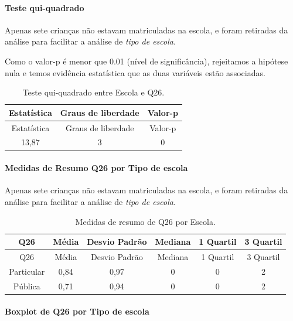 \documentclass[]{article}
\let\oldparagraph\paragraph
\renewcommand{\paragraph}[1]{\oldparagraph{#1}\mbox{}}
\begin{document}
\hypertarget{teste-qui-quadrado-66}{%
\paragraph{Teste qui-quadrado}\label{teste-qui-quadrado-66}}

Apenas sete crianças não estavam matriculadas na escola, e foram retiradas da análise para facilitar a análise de \emph{tipo de escola}.

Como o valor-p é menor que 0.01 (nível de significância), rejeitamos a hipótese nula e temos evidência estatística que as duas variáveis estão associadas.

\begin{longtable}[]{@{}ccc@{}}
\caption{\label{tab:unnamed-chunk-764}Teste qui-quadrado entre Escola e Q26.}\tabularnewline
\toprule
Estatística & Graus de liberdade & Valor-p\tabularnewline
\midrule
\endfirsthead
\toprule
Estatística & Graus de liberdade & Valor-p\tabularnewline
\midrule
\endhead
13,87 & 3 & 0\tabularnewline
\bottomrule
\end{longtable}

\cleardoublepage

\hypertarget{medidas-de-resumo-q26-por-tipo-de-escola}{%
\paragraph{Medidas de Resumo Q26 por Tipo de escola}\label{medidas-de-resumo-q26-por-tipo-de-escola}}

Apenas sete crianças não estavam matriculadas na escola, e foram retiradas da análise para facilitar a análise de \emph{tipo de escola}.

\begin{longtable}[]{@{}cccccc@{}}
\caption{\label{tab:unnamed-chunk-765}Medidas de resumo de Q26 por Escola.}\tabularnewline
\toprule
Q26 & Média & Desvio Padrão & Mediana & 1 Quartil & 3 Quartil\tabularnewline
\midrule
\endfirsthead
\toprule
Q26 & Média & Desvio Padrão & Mediana & 1 Quartil & 3 Quartil\tabularnewline
\midrule
\endhead
Particular & 0,84 & 0,97 & 0 & 0 & 2\tabularnewline
Pública & 0,71 & 0,94 & 0 & 0 & 2\tabularnewline
\bottomrule
\end{longtable}

\hypertarget{boxplot-de-q26-por-tipo-de-escola}{%
\paragraph{Boxplot de Q26 por Tipo de escola}\label{boxplot-de-q26-por-tipo-de-escola}}
\end{document}
